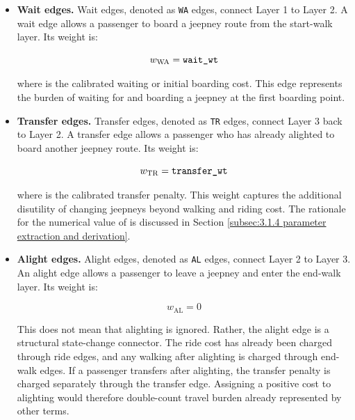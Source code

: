 {{\begin{itemize}
    \item \textbf{Wait edges.} Wait edges, denoted as \texttt{WA} edges, connect Layer 1 to Layer 2. A wait edge allows a passenger to board a jeepney route from the start-walk layer. Its weight is:

    \begin{equation}
    w_{\mathrm{WA}} =
    \text{\texttt{wait\_wt}}
    \end{equation}

    where  is the calibrated waiting or initial boarding cost. This edge represents the burden of waiting for and boarding a jeepney at the first boarding point.

    \item \textbf{Transfer edges.} Transfer edges, denoted as \texttt{TR} edges, connect Layer 3 back to Layer 2. A transfer edge allows a passenger who has already alighted to board another jeepney route. Its weight is:

    \begin{equation}
    w_{\mathrm{TR}} =
    \text{\texttt{transfer\_wt}}
    \end{equation}

    where  is the calibrated transfer penalty. This weight captures the additional disutility of changing jeepneys beyond walking and riding cost. The rationale for the numerical value of  is discussed in Section \ref{subsec:3.1.4 parameter extraction and derivation}.

    \item \textbf{Alight edges.} Alight edges, denoted as \texttt{AL} edges, connect Layer 2 to Layer 3. An alight edge allows a passenger to leave a jeepney and enter the end-walk layer. Its weight is:

    \begin{equation}
    w_{\mathrm{AL}} = 0
    \end{equation}

    This does not mean that alighting is ignored. Rather, the alight edge is a structural state-change connector. The ride cost has already been charged through ride edges, and any walking after alighting is charged through end-walk edges. If a passenger transfers after alighting, the transfer penalty is charged separately through the transfer edge. Assigning a positive cost to alighting would therefore double-count travel burden already represented by other terms.


\end{itemize}}}
